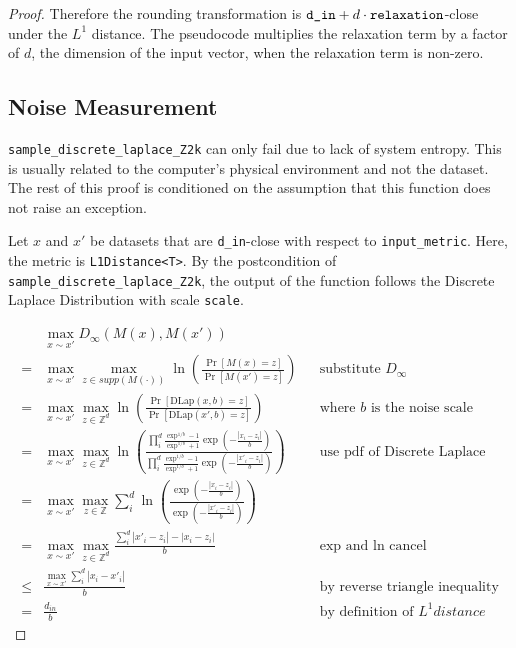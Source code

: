 \documentclass{article}
\begin{document}
\begin{proof}
Therefore the rounding transformation is $\texttt{d\_in} + d \cdot \texttt{relaxation}$-close under the $L^1$ distance.
The pseudocode multiplies the relaxation term by a factor of $d$, the dimension of the input vector,
when the relaxation term is non-zero.

\subsection{Noise Measurement}
\texttt{sample\_discrete\_laplace\_Z2k} can only fail due to lack of system entropy. 
This is usually related to the computer's physical environment and not the dataset. 
The rest of this proof is conditioned on the assumption that this function does not raise an exception. 

Let $x$ and $x'$ be datasets that are \texttt{d\_in}-close with respect to \texttt{input\_metric}.
Here, the metric is \texttt{L1Distance<T>}.
By the postcondition of \texttt{sample\_discrete\_laplace\_Z2k},
the output of the function follows the Discrete Laplace Distribution with scale \texttt{scale}.

\begin{align*}
    & \max_{x \sim x'} D_{\infty}(M(x), M(x'))  \\
    =& \max_{x \sim x'} \max_{z \in supp(M(\cdot))} \ln\left(\frac{\Pr\left[M(x) = z\right]}{\Pr\left[M(x') = z \right]}\right)
        &&\text{substitute } D_{\infty}\\
    =& \max_{x \sim x'} \max_{z \in \mathbb{Z}^d} \ln\left(\frac{\Pr\left[\mathrm{DLap}(x, b) = z \right]}{\Pr\left[\mathrm{DLap}(x', b) = z\right]}\right)
        &&\text{where } b \text{ is the noise scale} \\
    =& \max_{x \sim x'} \max_{z \in \mathbb{Z}^d} \ln\left(\frac{
        \prod_i^d \frac{\exp^{1/b} - 1}{\exp^{1/b} + 1} \exp \left( -\frac{|x_i - z_i|}{b} \right)
    }{
        \prod_i^d \frac{\exp^{1/b} - 1}{\exp^{1/b} + 1} \exp \left( -\frac{|x'_i - z_i|}{b} \right)
    }\right) 
        &&\text{use pdf of Discrete Laplace} \\
    =& \max_{x \sim x'} \max_{z \in \mathbb{Z}} \sum_i^d \ln\left(\frac{
        \exp \left( -\frac{|x_i - z_i|}{b} \right)
    }{
        \exp \left( -\frac{|x'_i - z_i|}{b} \right)
    }\right) \\
    =& \max_{x \sim x'} \max_{z \in \mathbb{Z}^d} \frac{\sum_i^d |x'_i - z_i| - |x_i - z_i|}{b}&& \text{exp and ln cancel} \\
    \leq& \frac{\max_{x \sim x'} \sum_i^d |x_i - x'_i|}{b} &&\text{by reverse triangle inequality} \\
    =& \frac{d_{in}}{b}  &&\text{by definition of } L^1 { distance}
\end{align*}


\end{proof}
\end{document}
